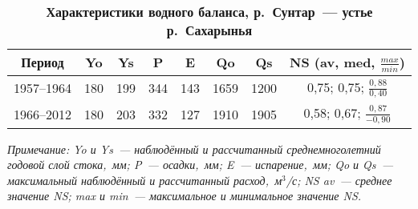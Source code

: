 
\begin{table}[H]
  \caption*{\textbf{Характеристики водного баланса, р.~Сунтар~--- устье р.~Сахарынья}}
  \label{tab:nesterova-1-tab}
  \vspace{-10pt}
  \begin{center}
  \begin{tabular}{cccccccc}
 \toprule
  Период    & Yo  & Ys  & P   & E   & Qo   & Qs   & NS 			(av, med, $\frac{max}{min}$)  \\[2pt]
 \midrule
  1957--1964 & 180 & 199 & 344 & 143 & 1659 & 1200 & 0,75; 			0,75; $\frac{0,88}{0,40}$  \\[6pt]
  1966--2012 & 180 & 203 & 332 & 127 & 1910 & 1905 & 0,58; 			0,67; $\frac{0,87}{-0,90}$ \\
\bottomrule
  \end{tabular}
\end{center}

\textit{Примечание: Yo и Ys~--- наблюдённый и рассчитанный среднемноголетний годовой слой стока,~мм; P~--- осадки,~мм; E~--- испарение,~мм; Qo и Qs~--- максимальный наблюдённый и рассчитанный расход,~м$^3$/с; NS av~--- среднее значение NS; max и min~--- максимальное и минимальное значение NS.}
\end{table}
